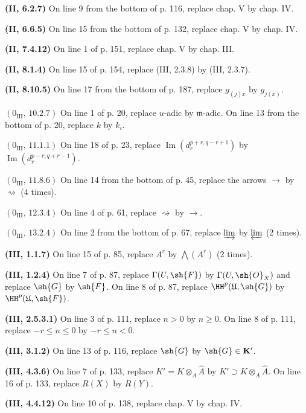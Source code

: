 \noindent\textbf{(II, 6.2.7)} On line 9 from the bottom of p. 116, replace
chap. V by chap. IV.

\noindent\textbf{(II, 6.6.5)} On line 15 from the bottom of p. 132, replace
chap. V by chap. IV.

\noindent\textbf{(II, 7.4.12)} On line 1 of p. 151, replace chap. V by chap.
III.

\noindent\textbf{(II, 8.1.4)} On line 15 of p. 154, replace (III, 2.3.8) by
(III, 2.3.7).

\noindent\textbf{(II, 8.10.5)} On line 17 from the bottom of p. 187, replace
$g_{(j)x}$ by $g_{j(x)}$.

\noindent\textbf{$(0_{\mathrm{III}},\,10.2.7)$} On line 1 of p. 20, replace
$u$-adic by $\mathfrak m$-adic. On line 13 from the bottom of p. 20, replace
$k$ by $k_i$.

\noindent\textbf{$(0_{\mathrm{III}},\,11.1.1)$} On line 18 of p. 23, replace
$\operatorname{Im}(d_r^{p+r,q-r+1})$ by
$\operatorname{Im}(d_r^{p-r,q+r-1})$.

\noindent\textbf{$(0_{\mathrm{III}},\,11.8.6)$} On line 14 from the bottom of
p. 45, replace the arrows $\to$ by $\rightsquigarrow$ (4 times).

\noindent\textbf{$(0_{\mathrm{III}},\,12.3.4)$} On line 4 of p. 61, replace
$\rightsquigarrow$ by $\to$.

\noindent\textbf{$(0_{\mathrm{III}},\,13.2.4)$} On line 2 from the bottom of
p. 67, replace $\varinjlim$ by $\varprojlim$ (2 times).

\noindent\textbf{(III, 1.1.7)} On line 15 of p. 85, replace $A^r$ by
$\bigwedge(A^r)$ (2 times).

\noindent\textbf{(III, 1.2.4)} On line 7 of p. 87, replace
$\Gamma(U,\sh{F})$ by $\Gamma(U,\sh{O}_X)$ and replace $\sh{G}$ by $\sh{F}$.
On line 8 of p. 87, replace $\HH^p(\mathfrak U,\sh{G})$ by
$\HH^p(\mathfrak U,\sh{F})$.

\noindent\textbf{(III, 2.5.3.1)} On line 3 of p. 111, replace $n>0$ by
$n\geq0$. On line 8 of p. 111, replace $-r\leq n\leq0$ by $-r\leq n<0$.

\noindent\textbf{(III, 3.1.2)} On line 13 of p. 116, replace $\sh{G}$ by
$\sh{G}\in\mathbf K'$.

\noindent\textbf{(III, 4.3.6)} On line 7 of p. 133, replace
$K'=K\otimes_A\widehat A$ by $K'\supset K\otimes_A\widehat A$. On line 16 of
p. 133, replace $R(X)$ by $R(Y)$.

\noindent\textbf{(III, 4.4.12)} On line 10 of p. 138, replace chap. V by
chap. IV.


